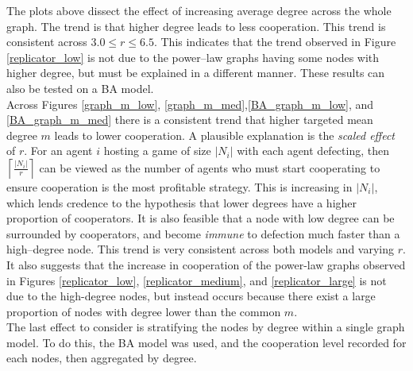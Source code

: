 The plots above dissect the effect of increasing average degree across the whole graph. The trend is that higher degree leads to less cooperation. This trend is consistent across $3.0\leq r\leq6.5$. This indicates that the trend observed in Figure \ref{replicator_low} is not due to the power--law graphs having some nodes with higher degree, but must be explained in a different manner. These results can also be tested on a BA model. \\
\FloatBarrier
{}
\FloatBarrier
{}
\FloatBarrier
Across Figures \ref{graph_m_low}, \ref{graph_m_med},\ref{BA_graph_m_low}, and \ref{BA_graph_m_med} there is a consistent trend that higher targeted mean degree $m$ leads to lower cooperation. A plausible explanation is the \emph{scaled effect} of $r$. For an agent $i$ hosting a game of size $|N_i|$ with each agent defecting, then $\left\lceil \frac{|N_i|}{r}\right\rceil$ can be viewed as the number of agents who must start cooperating to ensure cooperation is the most profitable strategy. This is increasing in $|N_i|$, which lends credence to the hypothesis that lower degrees have a higher proportion of cooperators. It is also feasible that a node with low degree can be surrounded by cooperators, and become \emph{immune} to defection much faster than a high--degree node. This trend is very consistent across both models and varying $r$. \\

It also suggests that the increase in cooperation of the power-law graphs observed in Figures \ref{replicator_low}, \ref{replicator_medium}, and \ref{replicator_large} is not due to the high-degree nodes, but instead occurs because there exist a large proportion of nodes with degree lower than the common $m$.  \\

The last effect to consider is stratifying the nodes by degree within a single graph model. To do this, the BA model was used, and the cooperation level recorded for each nodes, then aggregated by degree. \\

